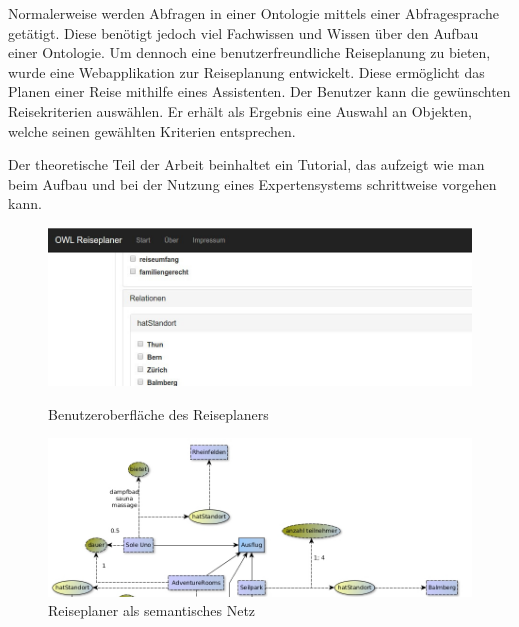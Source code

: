 \documentclass[
    paper=a4,               %
    fontsize=10pt,          %
    open=right,             %
    titlepage=false,        %
    parskip=half,           %
]{scrreprt}                 %
\begin{document}
\begin{multicols}{3}
        Normalerweise werden Abfragen in einer Ontologie mittels einer Abfragesprache getätigt. Diese benötigt jedoch viel Fachwissen und Wissen über den Aufbau einer Ontologie. Um dennoch eine benutzerfreundliche Reiseplanung zu bieten, wurde eine Webapplikation zur Reiseplanung entwickelt. Diese ermöglicht das Planen einer Reise mithilfe eines Assistenten. Der Benutzer kann die gewünschten Reisekriterien auswählen. Er erhält als Ergebnis eine Auswahl an Objekten, welche seinen gewählten Kriterien entsprechen.

       Der theoretische Teil der Arbeit beinhaltet ein Tutorial, das aufzeigt wie man beim Aufbau und bei der Nutzung eines Expertensystems schrittweise vorgehen kann.

    \end{multicols}

    \begin{figure}[htbp]
        \begin{minipage}[hbt]{0,49\textwidth}
            \centering
            \includegraphics[scale=0.3]{bilder/reiseplaner_gui.jpg}
            \caption*{Benutzeroberfläche des Reiseplaners}
        \end{minipage}
        \begin{minipage}[hbt]{0,49\textwidth}
            \centering
            \includegraphics[scale=0.3]{bilder/semantisches_netz.jpg}
            \caption*{Reiseplaner als semantisches Netz}
        \end{minipage}
    \end{figure}
\end{document}
